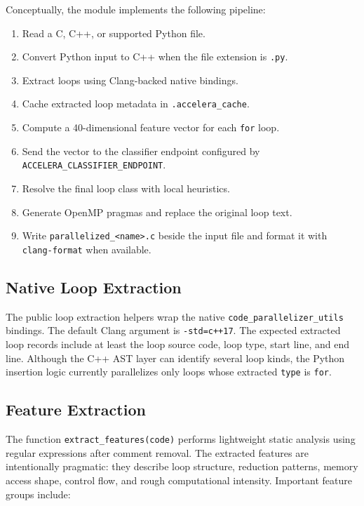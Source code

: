 \documentclass[11pt,a4paper]{article}
\newcommand{\modulepath}[1]{\texttt{#1}}
\begin{document}
Conceptually, the module implements the following pipeline:

\begin{enumerate}[leftmargin=*]
  \item Read a C, C++, or supported Python file.
  \item Convert Python input to C++ when the file extension is \texttt{.py}.
  \item Extract loops using Clang-backed native bindings.
  \item Cache extracted loop metadata in \modulepath{.accelera\_cache}.
  \item Compute a 40-dimensional feature vector for each \texttt{for} loop.
  \item Send the vector to the classifier endpoint configured by
        \texttt{ACCELERA\_CLASSIFIER\_ENDPOINT}.
  \item Resolve the final loop class with local heuristics.
  \item Generate OpenMP pragmas and replace the original loop text.
  \item Write \texttt{parallelized\_<name>.c} beside the input file and format
        it with \texttt{clang-format} when available.
\end{enumerate}

\subsection{Native Loop Extraction}

The public loop extraction helpers wrap the native
\texttt{code\_parallelizer\_utils} bindings. The default Clang argument is
\texttt{-std=c++17}. The expected extracted loop records include at least the
loop source code, loop type, start line, and end line. Although the C++ AST
layer can identify several loop kinds, the Python insertion logic currently
parallelizes only loops whose extracted \texttt{type} is \texttt{for}.

\subsection{Feature Extraction}

The function \texttt{extract\_features(code)} performs lightweight static
analysis using regular expressions after comment removal. The extracted
features are intentionally pragmatic: they describe loop structure, reduction
patterns, memory access shape, control flow, and rough computational intensity.
Important feature groups include:
\end{document}
